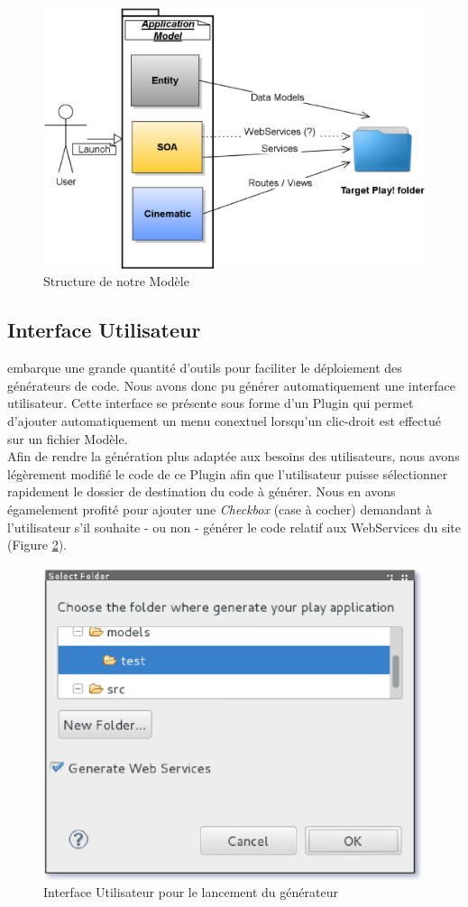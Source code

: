 \begin{figure}[htb]
  \centering
  \includegraphics[scale=0.4]{img/application_scheme.eps}
  \caption{Structure de notre Modèle }
  \label{fig:application}
\end{figure}


\subsection{Interface Utilisateur}

\kwacceleo embarque une grande quantité d'outils pour faciliter le déploiement des générateurs de code. Nous avons donc pu générer automatiquement une interface utilisateur. Cette interface se présente sous forme d'un Plugin \kweclipse qui permet d'ajouter automatiquement un menu conextuel  lorsqu'un clic-droit est effectué sur un fichier Modèle.
\\
Afin de rendre la génération plus adaptée aux besoins des utilisateurs, nous avons légèrement modifié le code de ce Plugin afin que l'utilisateur puisse sélectionner rapidement le dossier de destination du code à générer. Nous en avons égamelement profité pour ajouter une \textit{Checkbox} (case à cocher) demandant à l'utilisateur s'il souhaite - ou non - générer le code relatif aux WebServices du site \kwplay (Figure \ref{fig:ui}).

\begin{figure}[htb]
  \centering
  \includegraphics[scale=0.7]{img/screen_ui.eps}
  \caption{Interface Utilisateur pour le lancement du générateur}
  \label{fig:ui}
\end{figure}